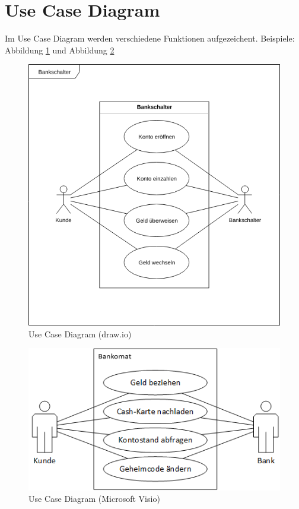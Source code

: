 \documentclass[a4paper, titlepage]{scrartcl}
\begin{document}
    \section{Use Case Diagram}
    Im Use Case Diagram werden verschiedene Funktionen aufgezeichent. 
    Beispiele: Abbildung \ref{UseCaseDrawIO} und Abbildung \ref{UseCaseVisio}
    \begin{figure}
        \includegraphics[width=\textwidth]{Anwendungsfalldiagramm1a.png}
        \caption{Use Case Diagram (draw.io)}
        \label{UseCaseDrawIO}
    \end{figure}
    \begin{figure}
        \includegraphics[width=\textwidth]{Anwendungsfalldiagramm1c.png}
        \caption{Use Case Diagram (Microsoft Visio)}
        \label{UseCaseVisio}
    \end{figure}
\end{document}
